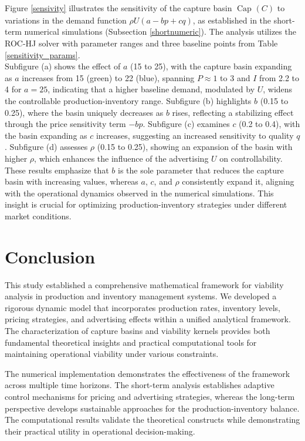 \documentclass[]{interact}
\theoremstyle{plain}%
\theoremstyle{definition}
\theoremstyle{remark}
\begin{document}
Figure \ref{sensivity} illustrates the sensitivity of the capture basin $\operatorname{Cap}_{}(C)$ to variations in the demand function $\rho U(a - bp + cq)$, as established in the short-term numerical simulations (Subsection \ref{shortnumeric}). The analysis utilizes the ROC-HJ solver with parameter ranges and three baseline points from Table \ref{sensitivity_params}.\\
Subfigure (a) shows the effect of $ a $ (15 to 25), with the capture basin expanding as $ a $ increases from 15 (green) to 22 (blue), spanning $ P \approx 1 $ to 3 and $ I $ from 2.2 to 4 for $ a = 25 $, indicating that a higher baseline demand, modulated by $ U $, widens the controllable production-inventory range. Subfigure (b) highlights $ b $ (0.15 to 0.25), where the basin uniquely decreases as $ b $ rises, reflecting a stabilizing effect through the price sensitivity term $-bp$. Subfigure (c) examines $ c $ (0.2 to 0.4), with the basin expanding as $ c $ increases, suggesting an increased sensitivity to quality $ q $. Subfigure (d) assesses $ \rho $ (0.15 to 0.25), showing an expansion of the basin with higher $ \rho $, which enhances the influence of the advertising $ U $ on controllability.\\
These results emphasize that $ b $ is the sole parameter that reduces the capture basin with increasing values, whereas $ a $, $ c $, and $ \rho $ consistently expand it, aligning with the operational dynamics observed in the numerical simulations. This insight is crucial for optimizing production-inventory strategies under different market conditions.





\section{Conclusion}
This study established a comprehensive mathematical framework for viability analysis in production and inventory management systems. We developed a rigorous dynamic model that incorporates production rates, inventory levels, pricing strategies, and advertising effects within a unified analytical framework. The characterization of capture basins and viability kernels provides both fundamental theoretical insights and practical computational tools for maintaining operational viability under various constraints.

The numerical implementation demonstrates the effectiveness of the framework across multiple time horizons. The short-term analysis establishes adaptive control mechanisms for pricing and advertising strategies, whereas the long-term perspective develops sustainable approaches for the production-inventory balance. The computational results validate the theoretical constructs while demonstrating their practical utility in operational decision-making.
\end{document}
